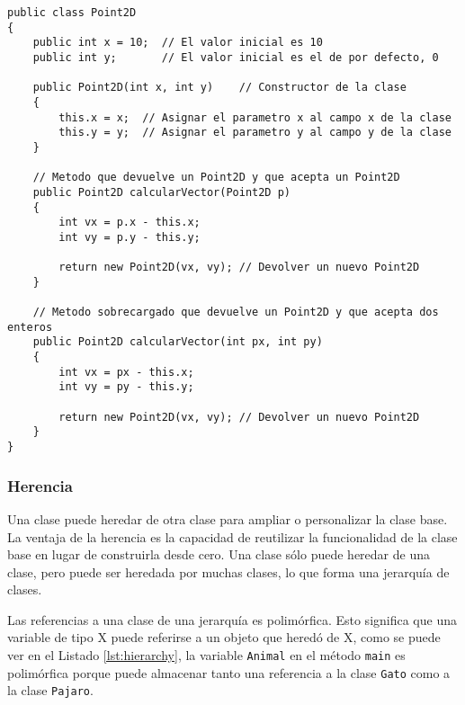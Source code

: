 \documentclass{pre-tfg}
\begin{document}
\begin{spacing}{1}
\begin{lstlisting}[float=htbp, caption={Ejemplo de clase con campos, sobrecarga de métodos y constructor}, label=lst:classwhole]
public class Point2D 
{ 
	public int x = 10;  // El valor inicial es 10
	public int y;       // El valor inicial es el de por defecto, 0
	
	public Point2D(int x, int y)    // Constructor de la clase
	{
		this.x = x;  // Asignar el parametro x al campo x de la clase
		this.y = y;  // Asignar el parametro y al campo y de la clase
	}
	
	// Metodo que devuelve un Point2D y que acepta un Point2D	
	public Point2D calcularVector(Point2D p)
	{
		int vx = p.x - this.x;
		int vy = p.y - this.y;
		
		return new Point2D(vx, vy); // Devolver un nuevo Point2D
	}
	
	// Metodo sobrecargado que devuelve un Point2D y que acepta dos enteros	
	public Point2D calcularVector(int px, int py)
	{
		int vx = px - this.x;
		int vy = py - this.y;
		
		return new Point2D(vx, vy); // Devolver un nuevo Point2D
	}
}
\end{lstlisting}
\end{spacing}

\subsubsection{Herencia}

Una clase puede heredar de otra clase para ampliar o personalizar la clase base. La ventaja de la herencia es la capacidad de reutilizar la funcionalidad de la clase base en lugar de construirla desde cero. Una clase sólo puede heredar de una clase, pero puede ser heredada por muchas clases, lo que forma una jerarquía de clases.

Las referencias a una clase de una jerarquía es polimórfica. Esto significa que una variable de tipo X puede referirse a un objeto que heredó de X, como se puede ver en el Listado \ref{lst:hierarchy}, la variable \texttt{Animal} en el método \texttt{main} es polimórfica porque puede almacenar tanto una referencia a la clase \texttt{Gato} como a la clase \texttt{Pajaro}.
\end{document}
